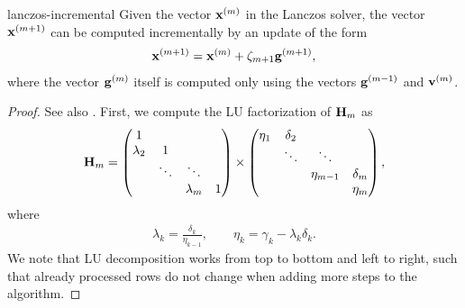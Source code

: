 \begin{Lemma}{lanczos-incremental}
  Given the vector $\mathbf x^{(m)}$ in the Lanczos solver, the vector
  $\mathbf x^{(m+1)}$ can be computed incrementally by an update of the form
  \begin{gather}
    \mathbf x^{(m+1)} = \mathbf x^{(m)} + \zeta_{m+1}\mathbf g^{(m+1)},
  \end{gather}
  where the vector $\mathbf g^{(m)}$ itself is computed only using the
  vectors $\mathbf g^{(m-1)}$ and $\mathbf v^{(m)}$.
\end{Lemma}

\begin{proof}
  See also \cite[Section 6.7.1]{Saad00}. First, we compute the LU factorization of $\mathbf H_m$ as
  \begin{gather}
    \mathbf H_m =
    \begin{pmatrix}
      1\\\lambda_2&1\\
      &\ddots&\ddots\\
      &&\lambda_m&1
    \end{pmatrix}
    \times
    \begin{pmatrix}
      \eta_1&\delta_2\\
      &\ddots&\ddots\\
      &&\eta_{m-1}&\delta_m\\
      &&&\eta_m
    \end{pmatrix},
  \end{gather}
  where
  \begin{gather}
    \lambda_k = \frac{\delta_k}{\eta_{k-1}},
    \qquad
    \eta_k = \gamma_k - \lambda_k \delta_k.
  \end{gather}
  We note that LU decomposition works from top to bottom and left to
  right, such that already processed rows do not change when adding
  more steps to the algorithm.


\end{proof}
